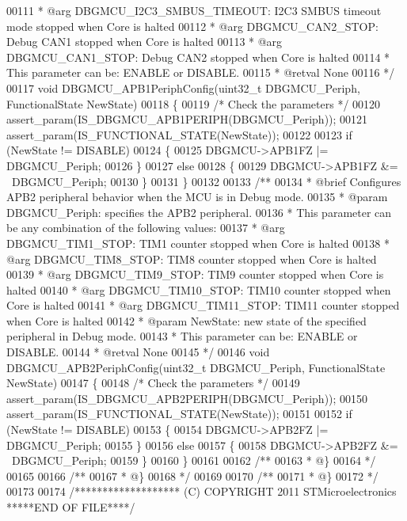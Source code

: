 \begin{DoxyCode}
00111 \textcolor{comment}{  *     @arg DBGMCU\_I2C3\_SMBUS\_TIMEOUT: I2C3 SMBUS timeout mode stopped when Core is halted}
00112 \textcolor{comment}{  *     @arg DBGMCU\_CAN2\_STOP: Debug CAN1 stopped when Core is halted           }
00113 \textcolor{comment}{  *     @arg DBGMCU\_CAN1\_STOP: Debug CAN2 stopped when Core is halted        }
00114 \textcolor{comment}{  *   This parameter can be: ENABLE or DISABLE.}
00115 \textcolor{comment}{  * @retval None}
00116 \textcolor{comment}{  */}
00117 \textcolor{keywordtype}{void} DBGMCU_APB1PeriphConfig(uint32\_t DBGMCU\_Periph, FunctionalState NewState)
00118 \{
00119   \textcolor{comment}{/* Check the parameters */}
00120   assert_param(IS\_DBGMCU\_APB1PERIPH(DBGMCU\_Periph));
00121   assert_param(IS\_FUNCTIONAL\_STATE(NewState));
00122 
00123   \textcolor{keywordflow}{if} (NewState != DISABLE)
00124   \{
00125     DBGMCU->APB1FZ |= DBGMCU\_Periph;
00126   \}
00127   \textcolor{keywordflow}{else}
00128   \{
00129     DBGMCU->APB1FZ &= ~DBGMCU\_Periph;
00130   \}
00131 \}
00132 
00133 \textcolor{comment}{/**}
00134 \textcolor{comment}{  * @brief  Configures APB2 peripheral behavior when the MCU is in Debug mode.}
00135 \textcolor{comment}{  * @param  DBGMCU\_Periph: specifies the APB2 peripheral.}
00136 \textcolor{comment}{  *   This parameter can be any combination of the following values:       }
00137 \textcolor{comment}{  *     @arg DBGMCU\_TIM1\_STOP: TIM1 counter stopped when Core is halted                }
00138 \textcolor{comment}{  *     @arg DBGMCU\_TIM8\_STOP: TIM8 counter stopped when Core is halted}
00139 \textcolor{comment}{  *     @arg DBGMCU\_TIM9\_STOP: TIM9 counter stopped when Core is halted   }
00140 \textcolor{comment}{  *     @arg DBGMCU\_TIM10\_STOP: TIM10 counter stopped when Core is halted   }
00141 \textcolor{comment}{  *     @arg DBGMCU\_TIM11\_STOP: TIM11 counter stopped when Core is halted                             
                                                           }
00142 \textcolor{comment}{  * @param  NewState: new state of the specified peripheral in Debug mode.}
00143 \textcolor{comment}{  *   This parameter can be: ENABLE or DISABLE.}
00144 \textcolor{comment}{  * @retval None}
00145 \textcolor{comment}{  */}
00146 \textcolor{keywordtype}{void} DBGMCU_APB2PeriphConfig(uint32\_t DBGMCU\_Periph, FunctionalState NewState)
00147 \{
00148   \textcolor{comment}{/* Check the parameters */}
00149   assert_param(IS\_DBGMCU\_APB2PERIPH(DBGMCU\_Periph));
00150   assert_param(IS\_FUNCTIONAL\_STATE(NewState));
00151 
00152   \textcolor{keywordflow}{if} (NewState != DISABLE)
00153   \{
00154     DBGMCU->APB2FZ |= DBGMCU\_Periph;
00155   \}
00156   \textcolor{keywordflow}{else}
00157   \{
00158     DBGMCU->APB2FZ &= ~DBGMCU\_Periph;
00159   \}
00160 \}
00161 
00162 \textcolor{comment}{/**}
00163 \textcolor{comment}{  * @\}}
00164 \textcolor{comment}{  */}
00165 
00166 \textcolor{comment}{/**}
00167 \textcolor{comment}{  * @\}}
00168 \textcolor{comment}{  */}
00169 
00170 \textcolor{comment}{/**}
00171 \textcolor{comment}{  * @\}}
00172 \textcolor{comment}{  */}
00173 
00174 \textcolor{comment}{/******************* (C) COPYRIGHT 2011 STMicroelectronics *****END OF FILE****/}
\end{DoxyCode}
